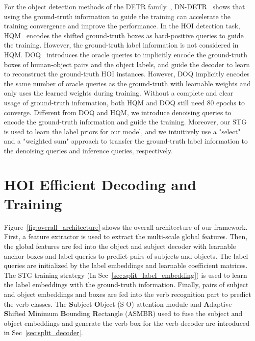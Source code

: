 \documentclass[10pt,twocolumn,letterpaper]{article}
\begin{document}
\quad For the object detection methods of the DETR family~\cite{carion2020end,zhu2020deformable,liu2022dabdetr}, DN-DETR~\cite{Li_2022_CVPR} shows that using the ground-truth information to guide the training can accelerate the training convergence and improve the performance.
In the HOI detection task, HQM~\cite{zhong2022towards} encodes the shifted ground-truth boxes as hard-positive queries to guide the training.
However, the ground-truth label information is not considered in HQM.
DOQ~\cite{qu2022distillation} introduces the oracle queries to implicitly encode the ground-truth boxes of human-object pairs and the object labels, and guide the decoder to learn to reconstruct the ground-truth HOI instances.
However, DOQ implicitly encodes the same number of oracle queries as the ground-truth with learnable weights and only uses the learned weights during training.
Without a complete and clear usage of ground-truth information, both HQM and DOQ still need 80 epochs to converge.
Different from DOQ and HQM, we introduce denoising queries to encode the ground-truth information and guide the training.
Moreover, our STG is used to learn the label priors for our model, and we intuitively use a "select" and a "weighted sum" approach to transfer the ground-truth label information to the denoising queries and inference queries, respectively.



\section{HOI Efficient Decoding and Training}

Figure~\ref{fig:overall_architecture} shows the overall architecture of our framework.
First, a feature extractor is used to extract the multi-scale global features.
Then, the global features are fed into the object and subject decoder with learnable anchor boxes and label queries to predict pairs of subjects and objects.
The label queries are initialized by the label embeddings and learnable coefficient matrices.
The STG training strategy (In Sec~\ref{sec:split_label_embedding}) is used to learn the label embeddings with the ground-truth information.
Finally, pairs of subject and object embeddings and boxes are fed into the verb recognition part to predict the verb classes.
The \textbf{S}ubject-\textbf{O}bject (S-O) attention module and \textbf{A}daptive \textbf{S}hifted \textbf{M}inimum \textbf{B}ounding \textbf{R}ectangle (ASMBR) used to fuse the subject and object embeddings and generate the verb box for the verb decoder are introduced in Sec~\ref{sec:split_decoder}.
\end{document}
